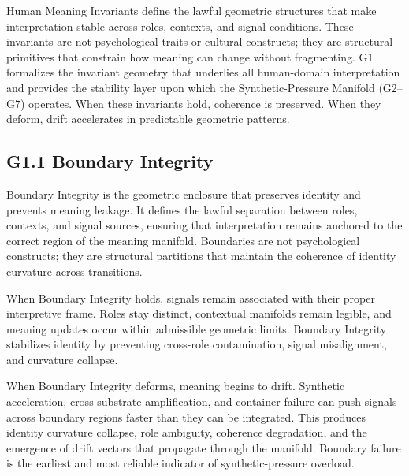 
\medskip

\noindent Human Meaning Invariants define the lawful geometric structures that
make interpretation stable across roles, contexts, and signal conditions. These
invariants are not psychological traits or cultural constructs; they are
structural primitives that constrain how meaning can change without fragmenting.
G1 formalizes the invariant geometry that underlies all human-domain
interpretation and provides the stability layer upon which the Synthetic-Pressure
Manifold (G2--G7) operates. When these invariants hold, coherence is preserved.
When they deform, drift accelerates in predictable geometric patterns.

\medskip

\subsection*{G1.1 Boundary Integrity}

\noindent Boundary Integrity is the geometric enclosure that preserves identity
and prevents meaning leakage. It defines the lawful separation between roles,
contexts, and signal sources, ensuring that interpretation remains anchored to
the correct region of the meaning manifold. Boundaries are not psychological
constructs; they are structural partitions that maintain the coherence of
identity curvature across transitions.

\medskip

\noindent When Boundary Integrity holds, signals remain associated with their
proper interpretive frame. Roles stay distinct, contextual manifolds remain
legible, and meaning updates occur within admissible geometric limits. Boundary
Integrity stabilizes identity by preventing cross-role contamination, signal
misalignment, and curvature collapse.

\medskip

\noindent When Boundary Integrity deforms, meaning begins to drift. Synthetic
acceleration, cross-substrate amplification, and container failure can push
signals across boundary regions faster than they can be integrated. This
produces identity curvature collapse, role ambiguity, coherence degradation, and
the emergence of drift vectors that propagate through the manifold. Boundary
failure is the earliest and most reliable indicator of synthetic-pressure
overload.

